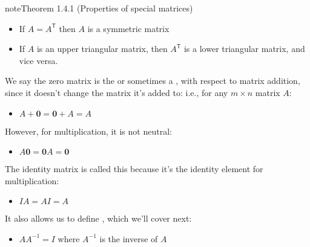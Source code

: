 \documentclass[letterpaper,10pt,english]{jupyterBook}
\begin{document}
\ignorespaces 
{}\ignorespaces 
{}\ignorespaces 
{}\ignorespaces 
{}\ignorespaces 
{}\ignorespaces \label{_pages/1.3_Special_matrices:theorem-0}
\begin{sphinxadmonition}{note}{Theorem 1.4.1 (Properties of special matrices)}


\begin{itemize}
\item {} 
\sphinxAtStartPar
If \(A = A^\mathsf{T}\) then \(A\) is a symmetric matrix

\item {} 
\sphinxAtStartPar
If \(A\) is an upper triangular matrix, then \(A^\mathsf{T}\) is a lower triangular matrix, and vice versa.

\end{itemize}

\sphinxAtStartPar
We say the zero matrix is the  or sometimes a , with respect to matrix addition, since it doesn’t change the matrix it’s added to: i.e., for any \(m \times n\) matrix \(A\):
\begin{itemize}
\item {} 
\sphinxAtStartPar
\( A + \mathbf{0} = \mathbf{0} + A = A\)

\end{itemize}

\sphinxAtStartPar
However, for multiplication, it is not neutral:
\begin{itemize}
\item {} 
\sphinxAtStartPar
\( A \mathbf{0} = \mathbf{0} A = \mathbf{0}\)

\end{itemize}

\sphinxAtStartPar
The identity matrix is called this because it’s the identity element for multiplication:
\begin{itemize}
\item {} 
\sphinxAtStartPar
\(I A = A I = A\)

\end{itemize}

\sphinxAtStartPar
It also allows us to define {\hyperref[\detokenize{_pages/1.5_Inverse_matrix:inverse-matrix-section}]{}}, which we’ll cover next:
\begin{itemize}
\item {} 
\sphinxAtStartPar
\(AA^{-1} = I\) where \(A^{-1}\) is the inverse of \(A\)

\end{itemize}
\end{sphinxadmonition}
\end{document}
